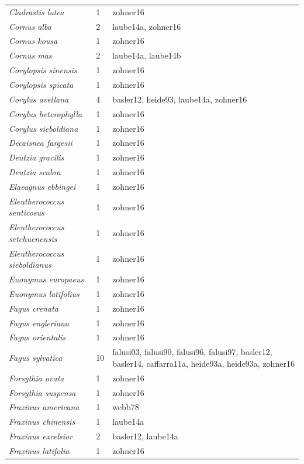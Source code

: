 \documentclass{article}
\begin{document}
\begin{footnotesize}
\begin{longtable}{p{}p{}p{}}
  \textit{Cladrastis lutea} &   1 & zohner16 \\ 
  \textit{Cornus alba} &   2 & laube14a, zohner16 \\ 
  \textit{Cornus kousa} &   1 & zohner16 \\ 
  \textit{Cornus mas} &   2 & laube14a, laube14b \\ 
  \textit{Corylopsis sinensis} &   1 & zohner16 \\ 
  \textit{Corylopsis spicata} &   1 & zohner16 \\ 
  \textit{Corylus avellana} &   4 & basler12, heide93, laube14a, zohner16 \\ 
  \textit{Corylus heterophylla} &   1 & zohner16 \\ 
  \textit{Corylus sieboldiana} &   1 & zohner16 \\ 
  \textit{Decaisnea fargesii} &   1 & zohner16 \\ 
  \textit{Deutzia gracilis} &   1 & zohner16 \\ 
  \textit{Deutzia scabra} &   1 & zohner16 \\ 
  \textit{Elaeagnus ebbingei} &   1 & zohner16 \\ 
  \textit{Eleutherococcus senticosus} &   1 & zohner16 \\ 
  \textit{Eleutherococcus setchuenensis} &   1 & zohner16 \\ 
  \textit{Eleutherococcus sieboldianus} &   1 & zohner16 \\ 
  \textit{Euonymus europaeus} &   1 & zohner16 \\ 
  \textit{Euonymus latifolius} &   1 & zohner16 \\ 
  \textit{Fagus crenata} &   1 & zohner16 \\ 
  \textit{Fagus engleriana} &   1 & zohner16 \\ 
  \textit{Fagus orientalis} &   1 & zohner16 \\ 
  \textit{Fagus sylvatica} &  10 & falusi03, falusi90, falusi96, falusi97, basler12, basler14, caffarra11a, heide93a, heide93a, zohner16 \\ 
  \textit{Forsythia ovata} &   1 & zohner16 \\ 
  \textit{Forsythia suspensa} &   1 & zohner16 \\ 
  \textit{Fraxinus americana} &   1 & webb78 \\ 
  \textit{Fraxinus chinensis} &   1 & laube14a \\ 
  \textit{Fraxinus excelsior} &   2 & basler12, laube14a \\ 
  \textit{Fraxinus latifolia} &   1 & zohner16 \\ 

\end{longtable}
\end{footnotesize}
\end{document}
